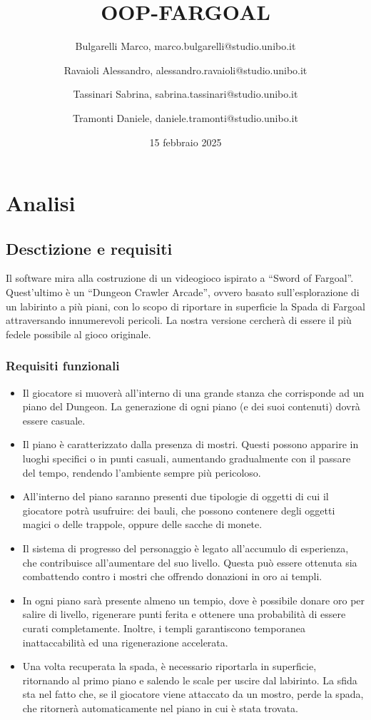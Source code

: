 \documentclass{report}
\title{OOP-FARGOAL}
\author{
    Bulgarelli Marco, marco.bulgarelli@studio.unibo.it \and 
    Ravaioli Alessandro, alessandro.ravaioli@studio.unibo.it \and
    Tassinari Sabrina, sabrina.tassinari@studio.unibo.it \and
    Tramonti Daniele, daniele.tramonti@studio.unibo.it 
}
\date{15 febbraio 2025}
\begin{document}
\maketitle

\tableofcontents

\chapter{Analisi}

\section{Desctizione e requisiti}

Il software mira alla costruzione di un videogioco ispirato a “Sword of Fargoal”. 
%
Quest’ultimo è un “Dungeon Crawler Arcade”, ovvero basato sull’esplorazione di un labirinto a più piani, con lo scopo di riportare in superficie la Spada di Fargoal attraversando innumerevoli pericoli. 
%
La nostra versione cercherà di essere il più fedele possibile al gioco originale.

\subsection*{Requisiti funzionali}
\begin{itemize}
    \item Il giocatore si muoverà all’interno di una grande stanza che corrisponde ad un piano del Dungeon. La generazione di ogni piano (e dei suoi contenuti) dovrà essere casuale.
    \item Il piano è caratterizzato dalla presenza di mostri. Questi possono apparire in luoghi specifici o in punti casuali, aumentando gradualmente con il passare del tempo, rendendo l’ambiente sempre più pericoloso.
    \item All’interno del piano saranno presenti due tipologie di oggetti di cui il giocatore potrà usufruire: dei bauli, che possono contenere degli oggetti magici o delle trappole, oppure delle sacche di monete.
    \item Il sistema di progresso del personaggio è legato all’accumulo di esperienza, che contribuisce all’aumentare del suo livello. Questa può essere ottenuta sia combattendo contro i mostri che offrendo donazioni in oro ai templi.
    \item In ogni piano sarà presente almeno un tempio, dove è possibile donare oro per salire di livello, rigenerare punti ferita e ottenere una probabilità di essere curati completamente. Inoltre, i templi garantiscono temporanea inattaccabilità ed una rigenerazione accelerata.
    \item Una volta recuperata la spada, è necessario riportarla in superficie, ritornando al primo piano e salendo le scale per uscire dal labirinto. La sfida sta nel fatto che, se il giocatore viene attaccato da un mostro, perde la spada, che ritornerà automaticamente nel piano in cui è stata trovata.
\end{itemize}
\end{document}
